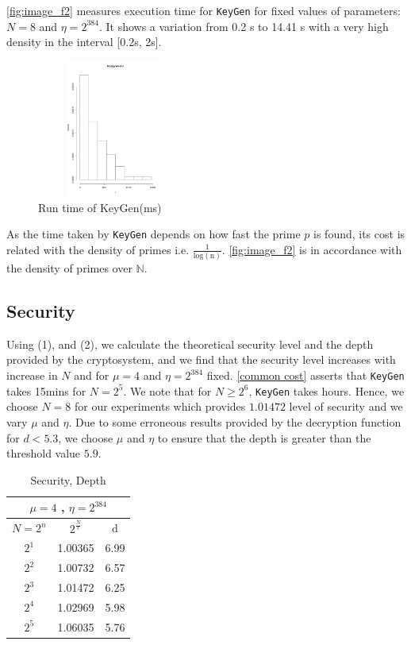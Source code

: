 \documentclass{acm_proc_article-sp}
\begin{document}
\autoref{fig:image_f2} measures execution time for \texttt{KeyGen} for fixed values of parameters: $N=8$ and $\eta = 2^{384}$. It shows a variation from 0.2 s to 14.41 s with a very high density in the interval [0.2s, 2s].

\begin{figure}[!h] %
\centering
\includegraphics[width=5cm, height=4.5cm]{f3.pdf} 
\caption{Run time of KeyGen(ms)} 
\label{fig:image_f2} %
\end{figure}

As the time taken by \texttt{KeyGen} depends on how fast the prime $p$ is found, its cost is related with the density of primes i.e. $\frac{1}{\mathrm{log(n)}}$. \autoref{fig:image_f2} is in accordance with the density of primes over $\mathbb{N}$.

\subsection{Security }

Using (1), and (2), we calculate the theoretical security level and the depth provided by the cryptosystem, and we find that the security level increases with increase in $N$ and for $\mu =4$ and $\eta=2^{384}$ fixed. \autoref{common cost} asserts that  \texttt{KeyGen} takes 15mins for $N=2^5$. We note that for $N \geq 2^6$, \texttt{KeyGen} takes hours. Hence, we choose $N=8$ for our experiments which provides $1.01472$ level of security and we vary $\mu$ and $\eta$. Due to some erroneous results provided by the decryption function for $d<5.3$, we choose $\mu$ and $\eta$ to ensure that the depth is greater than the threshold value $5.9$.

\begin{table}[htb]
  \centering
  \caption{Security, Depth}
\begin{tabular}{|c|c|c||}
  \hline
  \multicolumn{3}{|c||}{$\mu = 4$ , $\eta = 2^{384}$} \\
  \hline
  $N=2^{n}$ &  $2^{\frac{N}{\epsilon}}$ & d \\
  \hline
  $2^{1}$ &  1.00365 & 6.99 \\
  $2^{2}$ &  1.00732 & 6.57\\
  $2^{3}$ &  1.01472 & 6.25\\
  $2^{4}$ &  1.02969 & 5.98\\
  $2^{5}$ & 1.06035 & 5.76\\
  \hline
\end{tabular}
\normalsize
\label{tab:securitytab}
\end{table}
\end{document}
